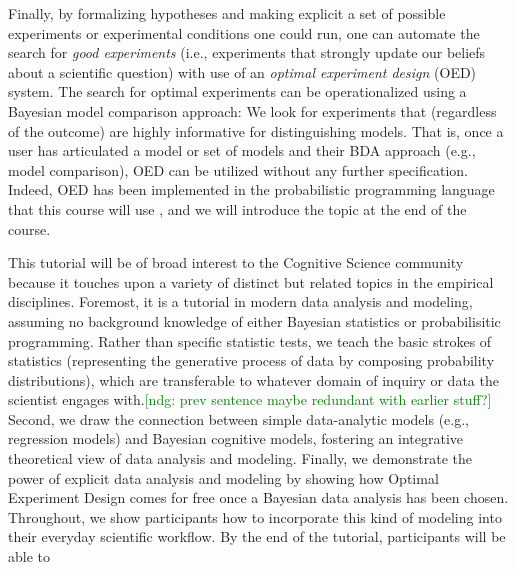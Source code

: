 \documentclass[10pt,letterpaper]{article}
\newcommand{\ndg}[1]{\textcolor{green}{[ndg: #1]}}
\begin{document}
Finally, by formalizing hypotheses and making explicit a set of possible experiments or experimental conditions one could run, one can automate the search for \emph{good experiments} (i.e., experiments that strongly update our beliefs about a scientific question) with use of an \emph{optimal experiment design} (OED) system.
The search for optimal experiments can be operationalized using a Bayesian model comparison approach: We look for experiments that (regardless of the outcome) are highly informative for distinguishing models. 
That is, once a user has articulated a model or set of models and their BDA approach (e.g., model comparison), OED can be utilized without any further specification. 
Indeed, OED has been implemented in the probabilistic programming language that this course will use \cite{ouyangArxivOED}, and we will introduce the topic at the end of the course.




This tutorial will be of broad interest to the Cognitive Science community because it touches upon a variety of distinct but related topics in the empirical disciplines. 
Foremost, it is a tutorial in modern data analysis and modeling, assuming no background knowledge of either Bayesian statistics or probabilisitic programming. 
Rather than specific statistic tests, we teach the basic strokes of statistics (representing the generative process of data by composing probability distributions), which are transferable to whatever domain of inquiry or data the scientist engages with.\ndg{prev sentence maybe redundant with earlier stuff?}
Second, we draw the connection between simple data-analytic models (e.g., regression models) and Bayesian cognitive models, fostering an integrative theoretical view of data analysis and modeling.
Finally, we demonstrate the power of explicit data analysis and modeling by showing how Optimal Experiment Design comes for free once a Bayesian data analysis has been chosen.
Throughout, we show participants how to incorporate this kind of modeling into their everyday scientific workflow. 
%
By the end of the tutorial, participants will be able to 
\end{document}
